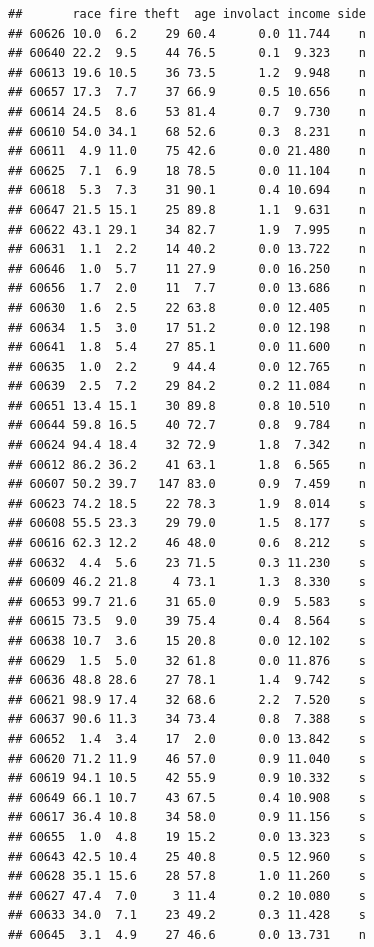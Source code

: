 \documentclass[
]{book}
\begin{document}
\begin{verbatim}
##       race fire theft  age involact income side
## 60626 10.0  6.2    29 60.4      0.0 11.744    n
## 60640 22.2  9.5    44 76.5      0.1  9.323    n
## 60613 19.6 10.5    36 73.5      1.2  9.948    n
## 60657 17.3  7.7    37 66.9      0.5 10.656    n
## 60614 24.5  8.6    53 81.4      0.7  9.730    n
## 60610 54.0 34.1    68 52.6      0.3  8.231    n
## 60611  4.9 11.0    75 42.6      0.0 21.480    n
## 60625  7.1  6.9    18 78.5      0.0 11.104    n
## 60618  5.3  7.3    31 90.1      0.4 10.694    n
## 60647 21.5 15.1    25 89.8      1.1  9.631    n
## 60622 43.1 29.1    34 82.7      1.9  7.995    n
## 60631  1.1  2.2    14 40.2      0.0 13.722    n
## 60646  1.0  5.7    11 27.9      0.0 16.250    n
## 60656  1.7  2.0    11  7.7      0.0 13.686    n
## 60630  1.6  2.5    22 63.8      0.0 12.405    n
## 60634  1.5  3.0    17 51.2      0.0 12.198    n
## 60641  1.8  5.4    27 85.1      0.0 11.600    n
## 60635  1.0  2.2     9 44.4      0.0 12.765    n
## 60639  2.5  7.2    29 84.2      0.2 11.084    n
## 60651 13.4 15.1    30 89.8      0.8 10.510    n
## 60644 59.8 16.5    40 72.7      0.8  9.784    n
## 60624 94.4 18.4    32 72.9      1.8  7.342    n
## 60612 86.2 36.2    41 63.1      1.8  6.565    n
## 60607 50.2 39.7   147 83.0      0.9  7.459    n
## 60623 74.2 18.5    22 78.3      1.9  8.014    s
## 60608 55.5 23.3    29 79.0      1.5  8.177    s
## 60616 62.3 12.2    46 48.0      0.6  8.212    s
## 60632  4.4  5.6    23 71.5      0.3 11.230    s
## 60609 46.2 21.8     4 73.1      1.3  8.330    s
## 60653 99.7 21.6    31 65.0      0.9  5.583    s
## 60615 73.5  9.0    39 75.4      0.4  8.564    s
## 60638 10.7  3.6    15 20.8      0.0 12.102    s
## 60629  1.5  5.0    32 61.8      0.0 11.876    s
## 60636 48.8 28.6    27 78.1      1.4  9.742    s
## 60621 98.9 17.4    32 68.6      2.2  7.520    s
## 60637 90.6 11.3    34 73.4      0.8  7.388    s
## 60652  1.4  3.4    17  2.0      0.0 13.842    s
## 60620 71.2 11.9    46 57.0      0.9 11.040    s
## 60619 94.1 10.5    42 55.9      0.9 10.332    s
## 60649 66.1 10.7    43 67.5      0.4 10.908    s
## 60617 36.4 10.8    34 58.0      0.9 11.156    s
## 60655  1.0  4.8    19 15.2      0.0 13.323    s
## 60643 42.5 10.4    25 40.8      0.5 12.960    s
## 60628 35.1 15.6    28 57.8      1.0 11.260    s
## 60627 47.4  7.0     3 11.4      0.2 10.080    s
## 60633 34.0  7.1    23 49.2      0.3 11.428    s
## 60645  3.1  4.9    27 46.6      0.0 13.731    n
\end{verbatim}
\end{document}
